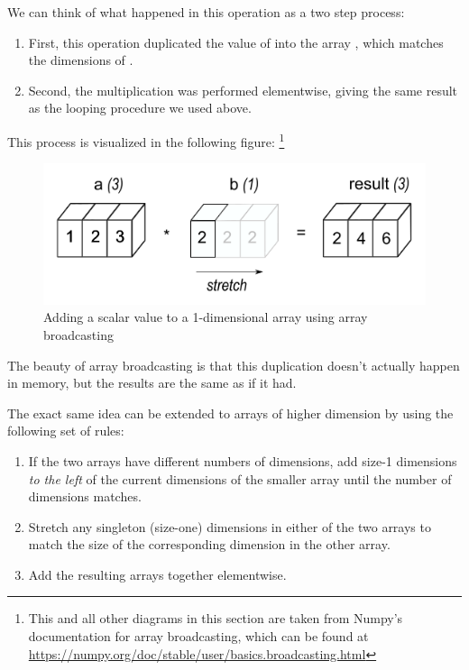 We can think of what happened in this operation as a two step process:
\begin{enumerate}
	\item[1)] First, this operation duplicated the value of  into the array \li{[2, 2, 2]}, which matches the dimensions of .
	\item[2)] Second, the multiplication  was performed elementwise, giving the same result as the looping procedure we used above.
\end{enumerate}
This process is visualized in the following figure:
\footnote{This and all other diagrams in this section are taken from Numpy's documentation for array broadcasting, which can be found at \url{https://numpy.org/doc/stable/user/basics.broadcasting.html}}
\begin{figure}[H]
    \includegraphics[width=.7\textwidth]{figures/broadcasting_scalar.png}
    \caption{Adding a scalar value to a 1-dimensional array using array broadcasting}
\end{figure}





The beauty of array broadcasting is that this duplication doesn't actually happen in memory, but the results are the same as if it had.

The exact same idea can be extended to arrays of higher dimension by using the following set of rules:

\begin{enumerate}
	\item[1)]  If the two arrays have different numbers of dimensions, add size-1 dimensions \emph{to the left} of the current dimensions of the smaller array until the number of dimensions matches.

	\item[2)] Stretch any singleton (size-one) dimensions in either of the two arrays to match the size of the corresponding dimension in the other array.

	\item[3)] Add the resulting arrays together elementwise.
\end{enumerate}

